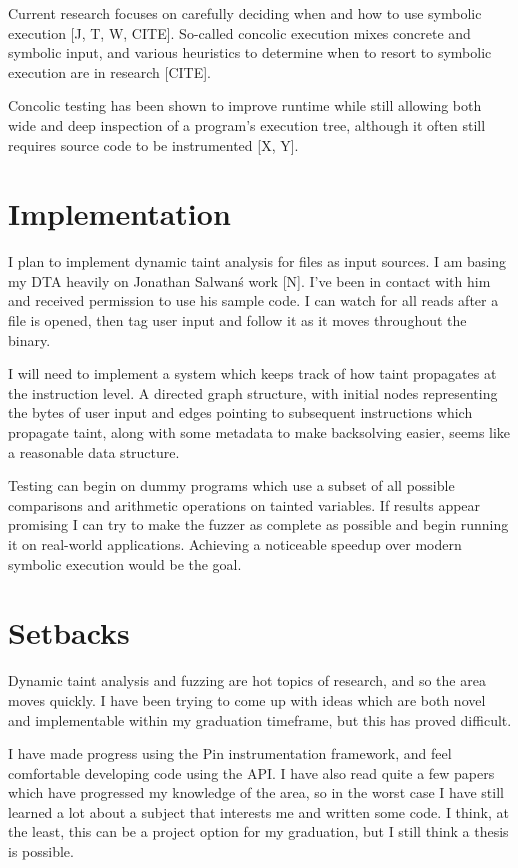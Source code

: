 \documentclass[10pt, twocolumn, times, nocopyrightspace, preprint]{sigplanconf}
\begin{document}
Current research focuses on carefully deciding when and how to use symbolic execution [J, T, W, CITE]. So-called concolic execution mixes concrete and symbolic input, and various heuristics to determine when to resort to symbolic execution are in research [CITE].

Concolic testing has been shown to improve runtime while still allowing both wide and deep inspection of a program's execution tree, although it often still requires source code to be instrumented [X, Y].


\section{Implementation}

I plan to implement dynamic taint analysis for files as input sources. I am basing my DTA heavily on Jonathan Salwan\'s work [N]. I've been in contact with him and received permission to use his sample code. I can watch for all reads after a file is opened, then tag user input and follow it as it moves throughout the binary.
	
I will need to implement a system which keeps track of how taint propagates at the instruction level. A directed graph structure, with initial nodes representing the bytes of user input and edges pointing to subsequent instructions which propagate taint, along with some metadata to make backsolving easier, seems like a reasonable data structure.

Testing can begin on dummy programs which use a subset of all possible comparisons and arithmetic operations on tainted variables. If results appear promising I can try to make the fuzzer as complete as possible and begin running it on real-world applications. Achieving a noticeable speedup over modern symbolic execution would be the goal.
	
\section{Setbacks}

Dynamic taint analysis and fuzzing are hot topics of research, and so the area moves quickly. I have been trying to come up with ideas which are both novel and implementable within my graduation timeframe, but this has proved difficult.

I have made progress using the Pin instrumentation framework, and feel comfortable developing code using the API. I have also read quite a few papers which have progressed my knowledge of the area, so in the worst case I have still learned a lot about a subject that interests me and written some code. I think, at the least, this can be a project option for my graduation, but I still think a thesis is possible.
\end{document}
